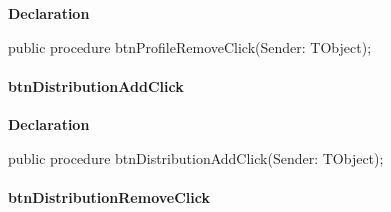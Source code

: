 \documentclass{report}
\newif\ifpdf
\begin{document}
\label{prjwizard.TfrmProjectWizard-btnProfileRemoveClick}
\begin{list}{}{
\setlength{\itemindent}{0cm}
\setlength{\listparindent}{0cm}
\setlength{\leftmargin}{\evensidemargin}
\addtolength{\leftmargin}{\tmplength}
\settowidth{\labelsep}{X}
\addtolength{\leftmargin}{\labelsep}
\setlength{\labelwidth}{\tmplength}
}
\item[\textbf{Declaration}\hfill]
\ifpdf
\begin{flushleft}
\fi
\begin{ttfamily}
public procedure btnProfileRemoveClick(Sender: TObject);\end{ttfamily}

\ifpdf
\end{flushleft}
\fi

\end{list}
\paragraph*{btnDistributionAddClick}\hspace*{\fill}

\label{prjwizard.TfrmProjectWizard-btnDistributionAddClick}
\begin{list}{}{
\setlength{\itemindent}{0cm}
\setlength{\listparindent}{0cm}
\setlength{\leftmargin}{\evensidemargin}
\addtolength{\leftmargin}{\tmplength}
\settowidth{\labelsep}{X}
\addtolength{\leftmargin}{\labelsep}
\setlength{\labelwidth}{\tmplength}
}
\item[\textbf{Declaration}\hfill]
\ifpdf
\begin{flushleft}
\fi
\begin{ttfamily}
public procedure btnDistributionAddClick(Sender: TObject);\end{ttfamily}

\ifpdf
\end{flushleft}
\fi

\end{list}
\paragraph*{btnDistributionRemoveClick}\hspace*{\fill}
\end{document}
